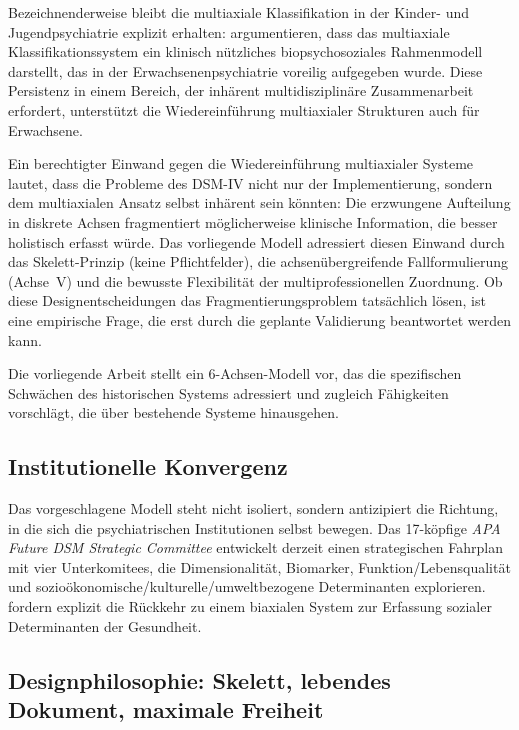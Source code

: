 \documentclass[11pt,a4paper]{article}
\begin{document}
Bezeichnenderweise bleibt die multiaxiale Klassifikation in der Kinder- und Jugendpsychiatrie explizit erhalten: \citet{BJPsychAdv2024} argumentieren, dass das multiaxiale Klassifikationssystem ein \glqq klinisch n\"utzliches biopsychosoziales Rahmenmodell\grqq{} darstellt, das in der Erwachsenenpsychiatrie voreilig aufgegeben wurde. Diese Persistenz in einem Bereich, der inh\"arent multidisziplin\"are Zusammenarbeit erfordert, unterst\"utzt die Wiedereinf\"uhrung multiaxialer Strukturen auch f\"ur Erwachsene.

Ein berechtigter Einwand gegen die Wiedereinf\"uhrung multiaxialer Systeme lautet, dass die Probleme des DSM-IV nicht nur der Implementierung, sondern dem multiaxialen Ansatz selbst inh\"arent sein k\"onnten: Die erzwungene Aufteilung in diskrete Achsen fragmentiert m\"oglicherweise klinische Information, die besser holistisch erfasst w\"urde. Das vorliegende Modell adressiert diesen Einwand durch das Skelett-Prinzip (keine Pflichtfelder), die achsen\"ubergreifende Fallformulierung (Achse~V) und die bewusste Flexibilit\"at der multiprofessionellen Zuordnung. Ob diese Designentscheidungen das Fragmentierungsproblem tats\"achlich l\"osen, ist eine empirische Frage, die erst durch die geplante Validierung beantwortet werden kann.

Die vorliegende Arbeit stellt ein 6-Achsen-Modell vor, das die spezifischen Schw\"achen des historischen Systems adressiert und zugleich F\"ahigkeiten vorschl\"agt, die \"uber bestehende Systeme hinausgehen.

\subsection{Institutionelle Konvergenz}

Das vorgeschlagene Modell steht nicht isoliert, sondern antizipiert die Richtung, in die sich die psychiatrischen Institutionen selbst bewegen. Das 17-k\"opfige \textit{APA Future DSM Strategic Committee} entwickelt derzeit einen \glqq strategischen Fahrplan\grqq{} mit vier Unterkomitees, die Dimensionalit\"at, Biomarker, Funktion/Lebensqualit\"at und sozio\"okonomische/kulturelle/umweltbezogene Determinanten explorieren. \citet{ErlichFirst2025} fordern explizit die R\"uckkehr zu einem biaxialen System zur Erfassung sozialer Determinanten der Gesundheit.


\subsection{Designphilosophie: Skelett, lebendes Dokument, maximale Freiheit}
\label{sec:designphilosophie}
\end{document}
